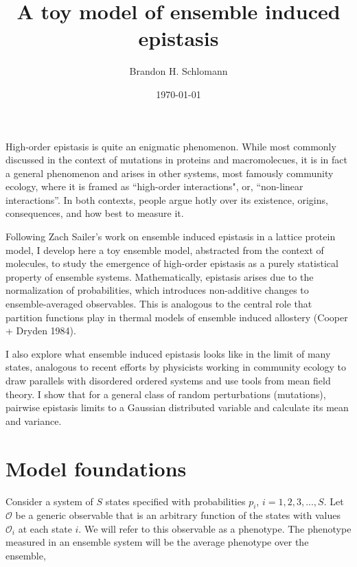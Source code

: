 \documentclass[12pt]{article}
\def\O{\mathcal{O}}
\begin{document}
\title{A toy model of ensemble induced epistasis}
\author{Brandon H. Schlomann}
\date{\today}




\maketitle
\setlength\parskip{12pt}
\setlength\parindent{0pt}

High-order epistasis is quite an enigmatic phenomenon.  While most commonly discussed in the context of mutations in proteins and macromolecues, it is in fact a general phenomenon and arises in other systems, most famously community ecology, where it is framed as ``high-order interactions", or, ``non-linear interactions''.  In both contexts, people argue hotly over its existence, origins, consequences, and how best to measure it.


Following Zach Sailer's work on ensemble induced epistasis in a lattice protein model, I develop here a toy ensemble model, abstracted from the context of molecules, to study the emergence of high-order epistasis as a purely statistical property of ensemble systems.  Mathematically, epistasis arises due to the normalization of probabilities, which introduces non-additive changes to ensemble-averaged observables.  This is analogous to the central role that partition functions play in thermal models of ensemble induced allostery (Cooper + Dryden 1984).

I also explore what ensemble induced epistasis looks like in the limit of many states, analogous to recent efforts by physicists working in community ecology to draw parallels with disordered ordered systems and use tools from mean field theory.  I show that for a general class of random perturbations (mutations), pairwise epistasis limits to a Gaussian distributed variable and calculate its mean and variance.


\section*{Model foundations}

Consider a system of $S$ states specified with probabilities $p_i$, $i = 1,2,3,...,S$.  Let $\O$ be a generic observable that is an arbitrary function of the states with values $\O_i$ at each state $i$.  We will refer to this observable as a phenotype.  The phenotype measured in an ensemble system will be the average phenotype over the ensemble,
\end{document}
